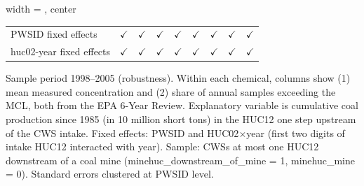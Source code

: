 \begin{table}[htbp]
\begin{adjustbox}{width = \textwidth, center}
\begin{tabular}{lcccccccc}
          \\
         
         PWSID fixed effects                 & $\checkmark$          & $\checkmark$          & $\checkmark$  & $\checkmark$  & $\checkmark$    & $\checkmark$    & $\checkmark$          & $\checkmark$\\   
         huc02-year fixed effects            & $\checkmark$          & $\checkmark$          & $\checkmark$  & $\checkmark$  & $\checkmark$    & $\checkmark$    & $\checkmark$          & $\checkmark$\\   
         
         \bottomrule
         
      \end{tabular}
      
      
      
   \end{adjustbox}
      {\tiny\linespread{1}\selectfont \par \raggedright 
   Sample period 1998--2005 (robustness). Within each chemical, columns show (1) mean measured concentration and (2) share of annual samples exceeding the MCL, both from the EPA 6-Year Review. Explanatory variable is cumulative coal production since 1985 (in 10 million short tons) in the HUC12 one step upstream of the CWS intake. Fixed effects: PWSID and HUC02$\times$year (first two digits of intake HUC12 interacted with year). Sample: CWSs at most one HUC12 downstream of a coal mine (minehuc\_downstream\_of\_mine = 1, minehuc\_mine = 0). Standard errors clustered at PWSID level.}
   
\end{table}



